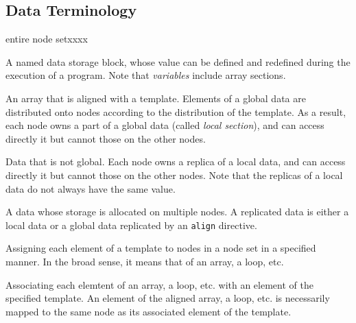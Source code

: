 \subsection{Data Terminology}

\begin{namelist}{entire node setxxxx}


 A named data storage block, whose value can be defined and redefined
 during the execution of a program. Note that {\it variables} include
 array sections.


 An array that is aligned with a template. Elements of a global data are
 distributed onto nodes according to the distribution of the
 template. As a result, each node owns a part of a global data (called
 {\it local section}), and can access directly it but cannot those on
 the other nodes.



 Data that is not global. Each node owns a replica of a local data,
 and can access directly it but cannot those on the other nodes. Note
 that the replicas of a local data do not always have the same value.



 A data whose storage is allocated on multiple nodes. A replicated data
 is either a local data or a global data replicated by an {\tt align}
 directive.


 Assigning each element of a template to nodes in a node set in a
 specified manner. In the broad sense, it means that of an array, a
 loop, etc.



 Associating each elemtent of an array, a loop, etc. with an element of
 the specified template. An element of the aligned array, a loop,
 etc. is necessarily mapped to the same node as its associated element
 of the template.


\end{namelist}

